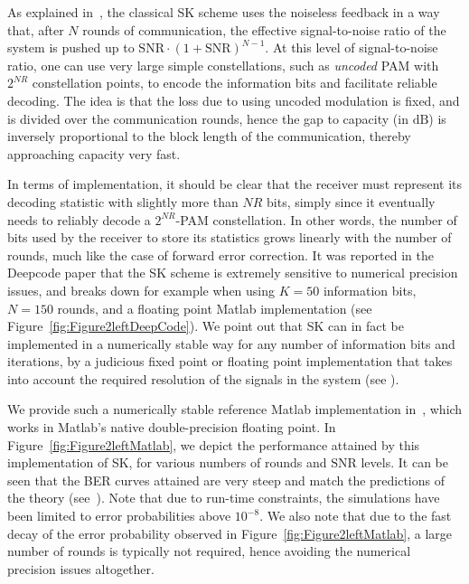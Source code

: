 \documentclass[article,onecolumn,11pt]{IEEEtran}
\newcommand{\dB}{\mathrm{dB}}
\newcommand{\snr}{\mathrm{SNR}}
\begin{document}
As explained in~\cite{ben2017interactive}, the classical SK scheme uses the noiseless feedback in a way that, after $N$ rounds of communication, the effective signal-to-noise ratio of the system is pushed up to $\snr\cdot(1+ \snr)^{N-1}$. At this level of signal-to-noise ratio, one can use very large simple constellations, such as \textit{uncoded} PAM with $2^{NR}$ constellation points, to encode the information bits and facilitate reliable decoding. The idea is that the loss due to using uncoded modulation is fixed, and is divided over the communication rounds, hence the gap to capacity (in $\dB$) is inversely proportional to the block length of the communication, thereby approaching capacity very fast.

In terms of implementation, it should be clear that the receiver must represent its decoding statistic with slightly more than $NR$ bits, simply since it eventually needs to reliably decode a $2^{NR}$-PAM constellation. In other words, the number of bits used by the receiver to store its statistics grows linearly with the number of rounds, much like the case of forward error correction. It was reported in the Deepcode paper that the SK scheme is extremely sensitive to numerical precision issues, and breaks down for example when using $K=50$ information bits, $N=150$ rounds, and a 
floating point Matlab implementation (see Figure~\ref{fig:Figure2leftDeepCode}). We point out that SK can in fact be implemented in a numerically stable way for any number of information bits and iterations, by a judicious fixed point or floating point implementation that takes into account the required resolution of the signals in the system (see \cite[p. 2419]{ben2017interactive}). 

We provide such a numerically stable reference Matlab implementation in~\cite{ModuloSKcode}, which works in Matlab's native double-precision floating point. In Figure~\ref{fig:Figure2leftMatlab}, we depict the performance attained by this implementation of SK, for various numbers of rounds and $\snr$ levels. It can be seen that the BER curves attained are very steep and match the predictions of the theory (see~\cite{ben2017interactive}). Note that due to run-time constraints, the simulations have been limited to error probabilities above $10^{-8}$. 
We also note that due to the fast decay of the error probability observed in Figure~\ref{fig:Figure2leftMatlab}, a large number of rounds is typically not required, hence avoiding the numerical precision issues altogether.



{\footnotesize }
\end{document}
